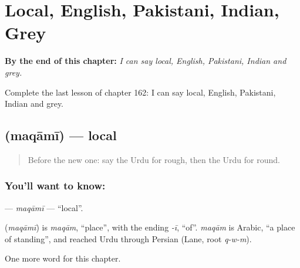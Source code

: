 
\chapter{Local, English, Pakistani, Indian, Grey}
\label{ch:ur-local-english-pakistani-indian-grey}

\begin{chapteropening}
\textbf{By the end of this chapter:} \emph{I can say local, English, Pakistani, Indian and grey.}

Complete the last lesson of chapter 162: I can say local, English, Pakistani, Indian and grey.
\end{chapteropening}

\section[\texorpdfstring{\ur{مقامی} (maqāmī)}{مقامی (maqāmī)}]{ (maqāmī) — local}

\label{lesson:UR-C162-maqami}



\begin{quote}
Before the new one: say the Urdu for rough, then the Urdu for round.
\end{quote}

\subsection*{You'll want to know: }
\textbf{} — \emph{maqāmī} — \textquotedblleft{}local\textquotedblright{}.

\begin{cousinweb}
\textbf{} (\emph{maqāmī}) is \emph{maqām}, \textquotedblleft{}place\textquotedblright{}, with the ending \emph{-ī}, \textquotedblleft{}of\textquotedblright{}. \emph{maqām} is Arabic, \textquotedblleft{}a place of standing\textquotedblright{}, and reached Urdu through Persian (Lane, root \emph{q-w-m}).
\end{cousinweb}

\begin{grammarlens}[title={What you've built}]
One more word for this chapter.
\end{grammarlens}

